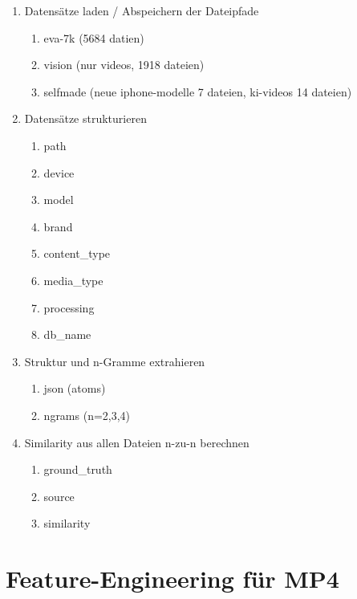 \begin{enumerate}
    \item Datensätze laden / Abspeichern der Dateipfade 
    \begin{enumerate}
        \item eva-7k (5684 datien)
        \item vision (nur videos, 1918 dateien)
        \item selfmade (neue iphone-modelle 7 dateien, ki-videos 14 dateien)
    \end{enumerate}
    \item Datensätze  strukturieren 
    \begin{enumerate}
        \item path
        \item device
        \item model
        \item brand
        \item content\_type
        \item media\_type
        \item processing
        \item db\_name
    \end{enumerate}
    \item Struktur und n-Gramme extrahieren
    \begin{enumerate}
        \item json (atoms)
        \item ngrams (n=2,3,4)
    \end{enumerate}
    \item Similarity aus allen Dateien n-zu-n berechnen
    \begin{enumerate}
        \item ground\_truth
        \item source
        \item similarity
    \end{enumerate}
\end{enumerate}



 


\section{Feature-Engineering für MP4}

